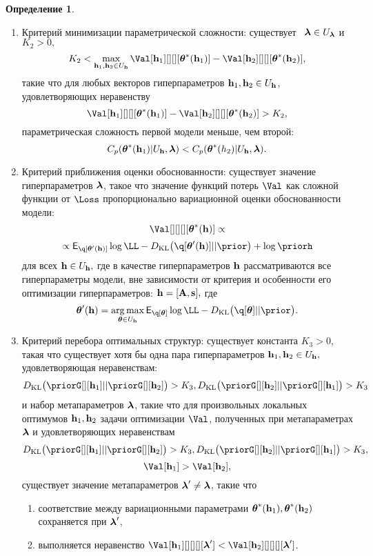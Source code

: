 \documentclass[11pt, a5paper]{dissert}
\theoremstyle{definition}
\newtheorem{defin}{Определение}
\DeclareMathOperator*{\argmax}{arg\,max}
\begin{document}
{\begin{defin}
\begin{enumerate}
\item Критерий минимизации параметрической сложности:  существует  $\boldsymbol{\lambda} \in U_{\boldsymbol{\lambda}}$ и $K_2>0,$ $$K_2 < \max_{\h_1, \h_2 \in \Uh} \Val[\h_1][][][\teta^{*}(\h_1)] - \Val[\h_2][][][\teta^{*}(\h_2)],$$ такие что для любых векторов гиперпараметров $\mathbf{h}_1,\mathbf{h}_2 \in U_{\mathbf{h}}$, удовлетворяющих неравенству $$\Val[\h_1][][][\teta^{*}(\h_1)] - \Val[\h_2][][][\teta^{*}(\h_2)]>K_2,$$ параметрическая сложность первой модели меньше, чем второй: $$C_p(\boldsymbol{\theta}^{*}(\mathbf{h}_1)|U_{\mathbf{h}},\boldsymbol{\lambda})<C_p(\boldsymbol{\theta}^{*}(h_2)|U_{\mathbf{h}},\boldsymbol{\lambda}).$$

\item Критерий приближения оценки обоснованности: существует значение гиперпараметров $\boldsymbol{\lambda}$, такое что значение функций потерь $\Val$ как сложной функции от $\Loss$ пропорционально вариационной оценки обоснованности модели: $$\Val[][][][\teta^{*}(\h)] \propto $$
$$\propto
\E_{\q[\teta'(\h)]}\log\LL - \KL{\q[\teta'(\h)]}{\prior} + \log\priorh$$ для всех $\mathbf{h} \in U_{\mathbf{h}},$
где в качестве гиперпараметров $\mathbf{h}$ рассматриваются все гиперпараметры модели, вне зависимости от критерия и особенности его оптимизации гиперпараметров: $\mathbf{h} = [\mathbf{A}, \mathbf{s}],$
где $$\teta'(\h) = \argmax_{\teta \in \Uh} \E_{\q[\teta]}\log\LL - \KL{\q[\teta]}{\prior}.$$

\item Критерий перебора оптимальных структур: существует константа $K_3>0$, такая что существует хотя бы одна пара гиперпараметров $\mathbf{h}_1, \mathbf{h}_2 \in U_{\mathbf{h}},$ удовлетворяющая неравенствам:
$$\KL{\priorG[][\h_1]}{\priorG[][\h_2]} > K_3,\KL{\priorG[][\h_2]}{\priorG[][\h_1]}>K_3$$ и набор метапараметров $\boldsymbol{\lambda}$, такие что для произвольных локальных оптимумов  $\mathbf{h}_1,\mathbf{h}_2$ задачи оптимизации $\Val$, полученных при метапараметрах $\boldsymbol{\lambda}$ и удовлетворяющих неравенствам $$\KL{\priorG[][\h_1]}{\priorG[][\h_2]} > K_3, \KL{\priorG[][\h_2]}{\priorG[][\h_1]}>K_3,$$$$\Val[\h_1] > \Val[\h_2],$$  существует значение метапараметров $\boldsymbol{\lambda}' \neq \boldsymbol{\lambda}$, такие что
\begin{enumerate}
\item соответствие между вариационными параметрами $\boldsymbol{\theta}^{*}(\mathbf{h}_1),\boldsymbol{\theta}^{*}(\mathbf{h}_2)$ сохраняется при  $\boldsymbol{\lambda}'$,
\item выполняется неравенство $\Val[\h_1][][][][\lam'] < \Val[\h_2][][][][\lam']$.
\end{enumerate}



\end{enumerate}
\end{defin}}
\end{document}
